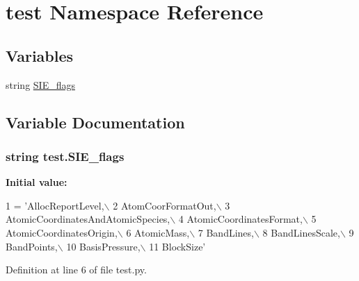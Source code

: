 \hypertarget{namespacetest}{\section{test Namespace Reference}
\label{namespacetest}
}
\subsection*{Variables}
\begin{DoxyCompactItemize}
\item 
string \hyperlink{namespacetest_ad3de7ab396cc90f5621f1b639747426c}{S\+I\+E\+\_\+flags}
\end{DoxyCompactItemize}


\subsection{Variable Documentation}
\hypertarget{namespacetest_ad3de7ab396cc90f5621f1b639747426c}{
\subsubsection[{S\+I\+E\+\_\+flags}]{\setlength{\rightskip}{0pt plus 5cm}string test.\+S\+I\+E\+\_\+flags}}\label{namespacetest_ad3de7ab396cc90f5621f1b639747426c}
{\bfseries Initial value\+:}
\begin{DoxyCode}
1 = \textcolor{stringliteral}{'AllocReportLevel,\(\backslash\)}
2 \textcolor{stringliteral}{AtomCoorFormatOut,\(\backslash\)}
3 \textcolor{stringliteral}{AtomicCoordinatesAndAtomicSpecies,\(\backslash\)}
4 \textcolor{stringliteral}{AtomicCoordinatesFormat,\(\backslash\)}
5 \textcolor{stringliteral}{AtomicCoordinatesOrigin,\(\backslash\)}
6 \textcolor{stringliteral}{AtomicMass,\(\backslash\)}
7 \textcolor{stringliteral}{BandLines,\(\backslash\)}
8 \textcolor{stringliteral}{BandLinesScale,\(\backslash\)}
9 \textcolor{stringliteral}{BandPoints,\(\backslash\)}
10 \textcolor{stringliteral}{BasisPressure,\(\backslash\)}
11 \textcolor{stringliteral}{BlockSize'}
\end{DoxyCode}


Definition at line 6 of file test.\+py.

